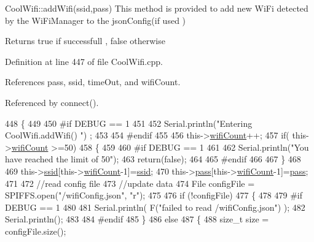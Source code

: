 Cool\+Wifi\+::add\+Wifi(ssid,pass) This method is provided to add new Wi\+Fi detected by the Wi\+Fi\+Manager to the json\+Config(if used )

\begin{DoxyReturn}{Returns}
true if successfull , false otherwise 
\end{DoxyReturn}


Definition at line 447 of file Cool\+Wifi.\+cpp.



References pass, ssid, time\+Out, and wifi\+Count.



Referenced by connect().


\begin{DoxyCode}
448 \{
449 
450 \textcolor{preprocessor}{#if DEBUG == 1}
451     
452     Serial.println(\textcolor{stringliteral}{"Entering CoolWifi.addWifi() "}) ;
453 
454 \textcolor{preprocessor}{#endif  }
455     
456     this->\hyperlink{classCoolWifi_ab133bd92fcb895b884deecd6678592e4}{wifiCount}++;
457     \textcolor{keywordflow}{if}( this->\hyperlink{classCoolWifi_ab133bd92fcb895b884deecd6678592e4}{wifiCount} >=50)
458     \{
459     
460 \textcolor{preprocessor}{    #if DEBUG == 1}
461 
462         Serial.println(\textcolor{stringliteral}{"You have reached the limit of 50"});
463         \textcolor{keywordflow}{return}(\textcolor{keyword}{false});  
464     
465 \textcolor{preprocessor}{    #endif}
466 
467     \}
468 
469     this->\hyperlink{classCoolWifi_a893b21d0fed821438733bba2e73fb4c2}{ssid}[this->\hyperlink{classCoolWifi_ab133bd92fcb895b884deecd6678592e4}{wifiCount}-1]=\hyperlink{classCoolWifi_a893b21d0fed821438733bba2e73fb4c2}{ssid};
470     this->\hyperlink{classCoolWifi_a0c3332a149245aaad060b32593a54c9b}{pass}[this->\hyperlink{classCoolWifi_ab133bd92fcb895b884deecd6678592e4}{wifiCount}-1]=\hyperlink{classCoolWifi_a0c3332a149245aaad060b32593a54c9b}{pass};
471     
472     \textcolor{comment}{//read config file}
473     \textcolor{comment}{//update data}
474     File configFile = SPIFFS.open(\textcolor{stringliteral}{"/wifiConfig.json"}, \textcolor{stringliteral}{"r"});
475 
476     \textcolor{keywordflow}{if} (!configFile) 
477     \{
478     
479 \textcolor{preprocessor}{    #if DEBUG == 1 }
480 
481         Serial.println( F(\textcolor{stringliteral}{"failed to read /wifiConfig.json"}) );
482         Serial.println();
483 
484 \textcolor{preprocessor}{    #endif}
485     \}
486     \textcolor{keywordflow}{else}
487     \{
488         \textcolor{keywordtype}{size\_t} size = configFile.size();

\end{DoxyCode}
